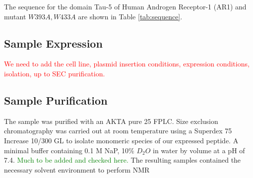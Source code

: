 The sequence for the domain Tau-5 of Human Androgen Receptor-1 (AR1) and mutant $W393A,W433A$ are shown in Table \ref{tab:sequence}. 



\subsection{Sample Expression}
\textcolor{red}{We need to add the cell line, plasmid insertion conditions, expression conditions, isolation, up to SEC purification.}


\subsection{Sample Purification}
The sample was purified with an AKTA pure 25 FPLC. 
Size exclusion chromatography was carried out at room temperature using a Superdex 75 Increase 10/300 GL to isolate monomeric species of our expressed peptide. 
A minimal buffer containing 0.1 M NaP, 10\% $D_2O$ in water by volume at a pH of 7.4. \textcolor{green}{Much to be added and checked here. }
The resulting samples contained the necessary solvent environment to perform NMR